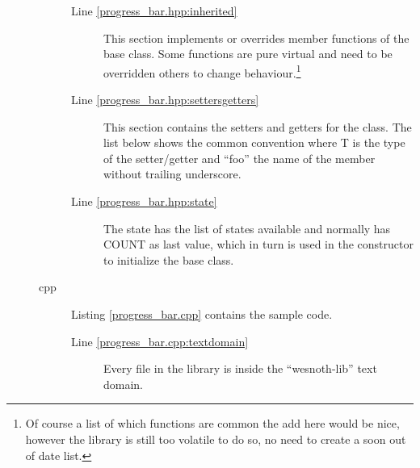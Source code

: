 \begin{description}
\begin{description}
\begin{description}
	\item[Line \ref{progress_bar.hpp:inherited}]
		This section implements or overrides member functions of the base class.
		Some functions are pure virtual and need to be overridden others to
		change behaviour.\footnote{Of course a list of which functions are
		common the add here would be nice, however the library is still too
		volatile to do so, no need to create a soon out of date list.}

	\item[Line \ref{progress_bar.hpp:settersgetters}]
		This section contains the setters and getters for the class. The
		list below shows the common convention where T is the type of the
		setter/getter and ``foo'' the name of the member without trailing
		underscore.


	\item[Line \ref{progress_bar.hpp:state}]
		The state has the list of states available and normally has COUNT as
		last value, which in turn is used in the constructor to initialize the
		base class.

	\end{description}

\item[cpp] Listing \ref{progress_bar.cpp} contains the sample code. 
	\begin{description}
	\item[Line \ref{progress_bar.cpp:textdomain}] Every file in the library
		is inside the ``wesnoth-lib'' text domain.


\end{description}
\end{description}
\end{description}
